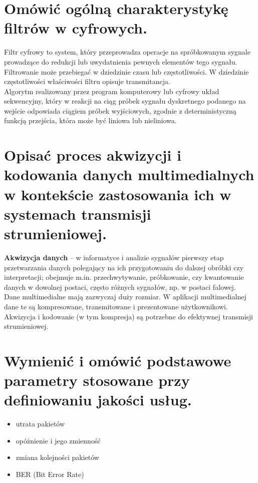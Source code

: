 \documentclass[12pt,a4paper]{article}
\begin{document}
	\section{Omówić ogólną charakterystykę filtrów w cyfrowych.}
	Filtr cyfrowy to system, który przeprowadza operacje na spróbkowanym sygnale prowadzące do redukcji lub uwydatnienia pewnych elementów tego sygnału. Filtrowanie może przebiegać w dziedzinie czasu lub częstotliwości. W dziedzinie częstotliwości właściwości filtru opisuje transmitancja.\\
    Algorytm realizowany przez program komputerowy lub cyfrowy układ sekwencyjny, który w reakcji na ciąg próbek sygnału dyskretnego podanego na wejście odpowiada ciągiem próbek wyjściowych, zgodnie z deterministyczną funkcją przejścia, która może być liniowa lub nieliniowa.

	\section{Opisać proces akwizycji i kodowania danych multimedialnych w kontekście zastosowania ich w systemach transmisji strumieniowej.}
	\textbf{Akwizycja danych} – w informatyce i analizie sygnałów pierwszy etap przetwarzania danych polegający na ich przygotowaniu do dalszej obróbki czy interpretacji; obejmuje m.in. przechwytywanie, próbkowanie, czy kwantowanie danych w dowolnej postaci, często różnych sygnałów, np. w postaci falowej.\\
	Dane multimedialne mają zazwyczaj duży rozmiar. W aplikacji multimedialnej dane te są kompresowane, transmitowane i prezentowane użytkownikowi. Akwizycja i kodowanie (w tym kompresja) są potrzebne do efektywnej transmisji strumieniowej.

	\section{Wymienić i omówić podstawowe parametry stosowane przy definiowaniu jakości usług.}
	\begin{itemize}
		\item utrata pakietów
		\item opóżnienie i jego zmienność
		\item zmiana kolejności pakietów
		\item BER (Bit Error Rate)
	\end{itemize}
\end{document}

